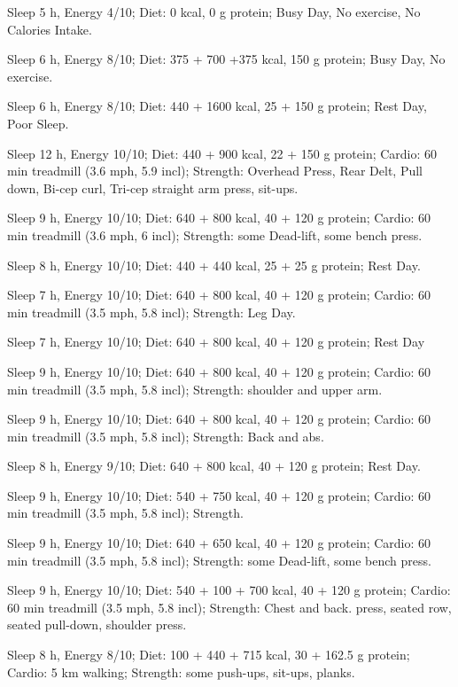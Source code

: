 \item [Oct 15] Sleep 5 h, Energy 4/10; Diet: 0 kcal, 0 g protein; Busy Day, No exercise, No Calories Intake.
\item [Oct 14] Sleep 6 h, Energy 8/10; Diet: 375 + 700 +375 kcal, 150 g protein; Busy Day, No exercise.
\item [Oct 13] Sleep 6 h, Energy 8/10; Diet: 440 + 1600 kcal, 25 + 150 g protein; Rest Day, Poor Sleep.
\item [Oct 12] Sleep 12 h, Energy 10/10; Diet: 440 + 900 kcal, 22 + 150 g protein; Cardio:  60 min treadmill (3.6 mph, 5.9 incl); Strength: Overhead Press, Rear Delt, Pull down, Bi-cep curl, Tri-cep straight arm press, sit-ups.
\item [Oct 11] Sleep 9 h, Energy 10/10; Diet: 640 + 800 kcal, 40 + 120 g protein; Cardio:
60 min treadmill (3.6 mph, 6 incl); Strength: some Dead-lift, some bench press.
\item [Oct 10] Sleep 8 h, Energy 10/10; Diet: 440 + 440 kcal, 25 + 25 g protein; Rest Day.
\item [Oct 9] Sleep 7 h, Energy 10/10; Diet: 640 + 800 kcal, 40 + 120 g protein; Cardio:
60 min treadmill (3.5 mph, 5.8 incl); Strength: Leg Day.
\item [Oct 8] Sleep 7 h, Energy 10/10; Diet: 640 + 800 kcal, 40 + 120 g protein; Rest Day
\item [Oct 7] Sleep 9 h, Energy 10/10; Diet: 640 + 800 kcal, 40 + 120 g protein; Cardio:
60 min treadmill (3.5 mph, 5.8 incl); Strength: shoulder and upper arm.
\item [Oct 6] Sleep 9 h, Energy 10/10; Diet: 640 + 800 kcal, 40 + 120 g protein; Cardio:
60 min treadmill (3.5 mph, 5.8 incl); Strength: Back and abs.
\item [Oct 5] Sleep 8 h, Energy 9/10; Diet: 640 + 800 kcal, 40 + 120 g protein; Rest Day.
\item [Oct 4] Sleep 9 h, Energy 10/10; Diet: 540 + 750 kcal, 40 + 120 g protein; Cardio:
60 min treadmill (3.5 mph, 5.8 incl); Strength.
\item [Oct 3] Sleep 9 h, Energy 10/10; Diet: 640 + 650 kcal, 40 + 120 g protein; Cardio:
60 min treadmill (3.5 mph, 5.8 incl); Strength: some Dead-lift, some bench press.
\item [Oct 2] Sleep 9 h, Energy 10/10; Diet: 540 + 100 + 700 kcal, 40 + 120 g protein; Cardio:
60 min treadmill (3.5 mph, 5.8 incl); Strength: Chest and back.
press, seated row, seated pull-down, shoulder press.
\item [Oct 1] Sleep 8 h, Energy 8/10; Diet: 100 + 440 + 715 kcal, 30 + 162.5 g protein; Cardio: 5 km walking; Strength: some push-ups, sit-ups, planks.
